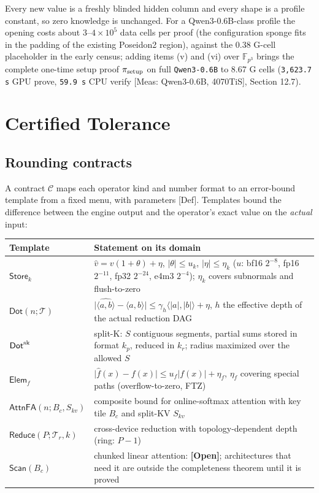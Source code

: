 \documentclass[10pt]{article}
\begin{document}
Every new value is a freshly blinded hidden column and every shape is a profile constant, so zero knowledge is unchanged. For a Qwen3-0.6B-class profile the opening costs about $3$--$4\times10^5$ data cells per proof (the configuration sponge fits in the padding of the existing Poseidon2 region), against the 0.38 G-cell placeholder in the early census; adding items (v) and (vi) over $\mathbb F_{p^3}$ brings the complete one-time setup proof $\pi_{\rm setup}$ on full \texttt{Qwen3-0.\allowbreak{}6B} to 8.67 G cells (\texttt{3,623.\allowbreak{}7 s} GPU prove, \texttt{59.\allowbreak{}9 s} CPU verify [Meas: Qwen3-0.6B, 4070TiS], Section 12.7).

\section{Certified Tolerance}
\subsection{Rounding contracts}
A contract $\mathcal C$ maps each operator kind and number format to an error-bound template from a fixed menu, with parameters [Def]. Templates bound the difference between the engine output and the operator's exact value on the \emph{actual} input:

\begin{center}\small
\begin{tabularx}{\linewidth}{>{\hsize}Y>{\hsize}Y}
\toprule
{}\textbf{Template} & {}\textbf{Statement on its domain} \\
\midrule
{}$\mathsf{Store}_k$ & {}$\hat v=v(1+\theta)+\eta$, $\lvert\theta\rvert\le u_k$, $\lvert\eta\rvert\le\eta_k$ ($u$: bf16 $2^{-8}$, fp16 $2^{-11}$, fp32 $2^{-24}$, e4m3 $2^{-4}$); $\eta_k$ covers subnormals and flush-to-zero \\
{}$\mathsf{Dot}(n;\mathcal T)$ & {}$\lvert\widehat{\langle a,b\rangle}-\langle a,b\rangle\rvert\le\gamma_h\langle\lvert a\rvert,\lvert b\rvert\rangle+\eta$, $h$ the effective depth of the actual reduction DAG \\
{}$\mathsf{Dot}^{\rm sk}$ & {}split-K: $S$ contiguous segments, partial sums stored in format $k_p$, reduced in $k_r$; radius maximized over the allowed $S$ \\
{}$\mathsf{Elem}_f$ & {}$\lvert\hat f(x)-f(x)\rvert\le u_f\lvert f(x)\rvert+\eta_f$, $\eta_f$ covering special paths (overflow-to-zero, FTZ) \\
{}$\mathsf{AttnFA}(n;B_c,S_{kv})$ & {}composite bound for online-softmax attention with key tile $B_c$ and split-KV $S_{kv}$ \\
{}$\mathsf{Reduce}(P;\mathcal T_r,k)$ & {}cross-device reduction with topology-dependent depth (ring: $P-1$) \\
{}$\mathsf{Scan}(B_c)$ & {}chunked linear attention: \textbf{[Open]}; architectures that need it are outside the completeness theorem until it is proved \\
\bottomrule
\end{tabularx}
\end{center}
\end{document}
